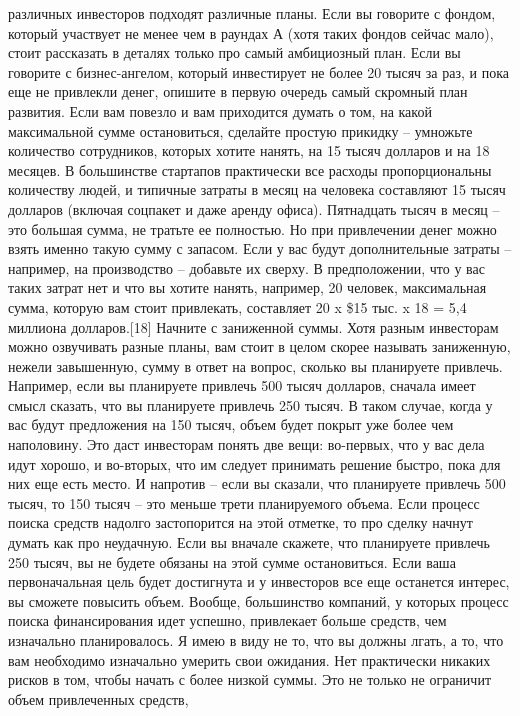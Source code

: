 \documentclass[ebook,12pt,oneside,openany]{memoir}
\begin{document}
различных инвесторов подходят различные планы. Если вы говорите с
фондом, который участвует не менее чем в раундах А (хотя таких фондов
сейчас мало), стоит рассказать в деталях только про самый амбициозный
план. Если вы говорите с бизнес-ангелом, который инвестирует не более
20 тысяч за раз, и пока еще не привлекли денег, опишите в первую
очередь самый скромный план развития. Если вам повезло и вам
приходится думать о том, на какой максимальной сумме остановиться,
сделайте простую прикидку – умножьте количество сотрудников, которых
хотите нанять, на 15 тысяч долларов и на 18 месяцев. В большинстве
стартапов практически все расходы пропорциональны количеству людей, и
типичные затраты в месяц на человека составляют 15 тысяч долларов
(включая соцпакет и даже аренду офиса). Пятнадцать тысяч в месяц – это
большая сумма, не тратьте ее полностью. Но при привлечении денег можно
взять именно такую сумму с запасом. Если у вас будут дополнительные
затраты – например, на производство – добавьте их сверху. В
предположении, что у вас таких затрат нет и что вы хотите нанять,
например, 20 человек, максимальная сумма, которую вам стоит
привлекать, составляет 20 x \$15 тыс. x 18 = 5,4 миллиона
долларов.[18] Начните с заниженной суммы. Хотя разным инвесторам можно
озвучивать разные планы, вам стоит в целом скорее называть заниженную,
нежели завышенную, сумму в ответ на вопрос, сколько вы планируете
привлечь. Например, если вы планируете привлечь 500 тысяч долларов,
сначала имеет смысл сказать, что вы планируете привлечь 250 тысяч. В
таком случае, когда у вас будут предложения на 150 тысяч, объем будет
покрыт уже более чем наполовину. Это даст инвесторам понять две вещи:
во-первых, что у вас дела идут хорошо, и во-вторых, что им следует
принимать решение быстро, пока для них еще есть место. И напротив –
если вы сказали, что планируете привлечь 500 тысяч, то 150 тысяч – это
меньше трети планируемого объема. Если процесс поиска средств надолго
застопорится на этой отметке, то про сделку начнут думать как про
неудачную. Если вы вначале скажете, что планируете привлечь 250 тысяч,
вы не будете обязаны на этой сумме остановиться. Если ваша
первоначальная цель будет достигнута и у инвесторов все еще останется
интерес, вы сможете повысить объем. Вообще, большинство компаний, у
которых процесс поиска финансирования идет успешно, привлекает больше
средств, чем изначально планировалось. Я имею в виду не то, что вы
должны лгать, а то, что вам необходимо изначально умерить свои
ожидания. Нет практически никаких рисков в том, чтобы начать с более
низкой суммы. Это не только не ограничит объем привлеченных средств,
\end{document}
